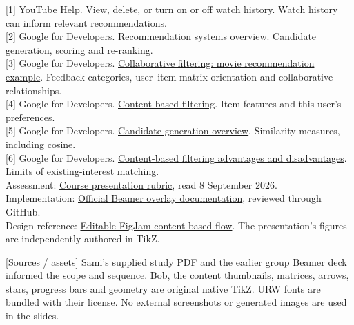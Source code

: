 \documentclass[11pt,a4paper]{article}
\newcommand{\parttitle}[2]{\vspace{9pt}{\color{forest}\large\bfseries #1}\hfill{\small #2}\par}
\begin{document}
\parttitle{Sources keyed to the slide footers}{}
{\small
[1] YouTube Help. \href{https://support.google.com/youtube/answer/95725?hl=en}{View, delete, or turn on or off watch history}. Watch history can inform relevant recommendations.\\[4pt]
[2] Google for Developers. \href{https://developers.google.com/machine-learning/recommendation/overview/types}{Recommendation systems overview}. Candidate generation, scoring and re-ranking.\\[4pt]
[3] Google for Developers. \href{https://developers.google.com/machine-learning/recommendation/collaborative/basics}{Collaborative filtering: movie recommendation example}. Feedback categories, user--item matrix orientation and collaborative relationships.\\[4pt]
[4] Google for Developers. \href{https://developers.google.com/machine-learning/recommendation/content-based/basics}{Content-based filtering}. Item features and this user's preferences.\\[4pt]
[5] Google for Developers. \href{https://developers.google.com/machine-learning/recommendation/overview/candidate-generation}{Candidate generation overview}. Similarity measures, including cosine.\\[4pt]
[6] Google for Developers. \href{https://developers.google.com/machine-learning/recommendation/content-based/summary}{Content-based filtering advantages and disadvantages}. Limits of existing-interest matching.\\[4pt]
Assessment: \href{https://docs.google.com/spreadsheets/d/13hVJ5WrcioEIvfQzsFdadwhF6t6n7sJk/edit?gid=137144296}{Course presentation rubric}, read 8 September 2026.\\[4pt]
Implementation: \href{https://github.com/josephwright/beamer/blob/main/doc/beamerug-overlays.tex}{Official Beamer overlay documentation}, reviewed through GitHub.\\[4pt]
Design reference: \href{https://www.figma.com/board/jf0wu99bi2lEHuuL2iPeoO}{Editable FigJam content-based flow}. The presentation's figures are independently authored in TikZ.
}

{\footnotesize [Sources / assets] Sami's supplied study PDF and the earlier group Beamer deck informed the scope and sequence. Bob, the content thumbnails, matrices, arrows, stars, progress bars and geometry are original native TikZ. URW fonts are bundled with their license. No external screenshots or generated images are used in the slides.}
\end{document}
